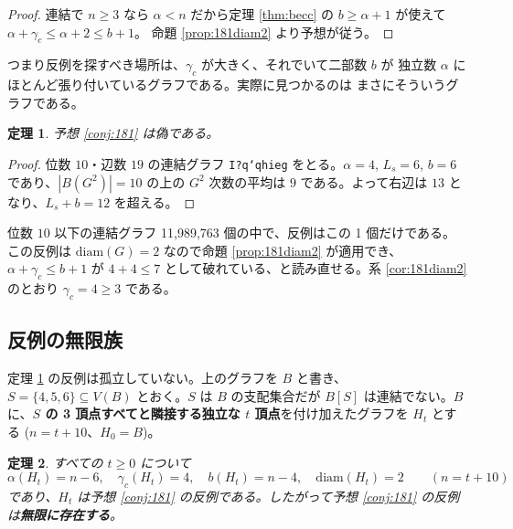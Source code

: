 \documentclass[paper=a4,fontsize=10.5pt,jafontsize=10.5pt]{jlreq}
\theoremstyle{plain}
\newtheorem{theorem}{定理}[section]
\theoremstyle{definition}
\begin{document}
\begin{proof}
連結で $n \ge 3$ なら $\alpha < n$ だから定理 \ref{thm:becc} の
$b \ge \alpha + 1$ が使えて
$\alpha + \gamma_c \le \alpha + 2 \le b + 1$。
命題 \ref{prop:181diam2} より予想が従う。
\end{proof}

つまり反例を探すべき場所は、$\gamma_c$ が大きく、それでいて二部数 $b$ が
独立数 $\alpha$ にほとんど張り付いているグラフである。実際に見つかるのは
まさにそういうグラフである。

\begin{theorem}\label{thm:181}
予想 \ref{conj:181} は偽である。
\end{theorem}

\begin{proof}
位数 $10$・辺数 $19$ の連結グラフ \texttt{I?q`qhieg} をとる。$\alpha = 4$, $L_s = 6$, $b = 6$ であり、$|B(G^2)| = 10$ の上の $G^2$ 次数の平均は $9$ である。よって右辺は $13$ となり、$L_s + b = 12$ を超える。
\end{proof}

位数 $10$ 以下の連結グラフ 11,989,763 個の中で、反例はこの 1 個だけである。この反例は $\mathrm{diam}(G) = 2$ なので命題 \ref{prop:181diam2} が適用でき、$\alpha + \gamma_c \le b + 1$ が $4 + 4 \le 7$ として破れている、と読み直せる。系 \ref{cor:181diam2} のとおり $\gamma_c = 4 \ge 3$ である。

\subsection{反例の無限族}\label{sec:181fam}

定理 \ref{thm:181} の反例は孤立していない。上のグラフを $B$ と書き、
$S = \{4, 5, 6\} \subseteq V(B)$ とおく。$S$ は $B$ の支配集合だが
$B[S]$ は連結でない。$B$ に、\textbf{$S$ の 3 頂点すべてと隣接する独立な
$t$ 頂点}を付け加えたグラフを $H_t$ とする ($n = t + 10$、$H_0 = B$)。

\begin{theorem}\label{thm:181fam}
すべての $t \ge 0$ について
\[ \alpha(H_t) = n - 6, \quad \gamma_c(H_t) = 4, \quad
   b(H_t) = n - 4, \quad \mathrm{diam}(H_t) = 2 \qquad (n = t + 10) \]
であり、$H_t$ は予想 \ref{conj:181} の反例である。したがって予想
\ref{conj:181} の反例は\textbf{無限に存在する}。
\end{theorem}
\end{document}
